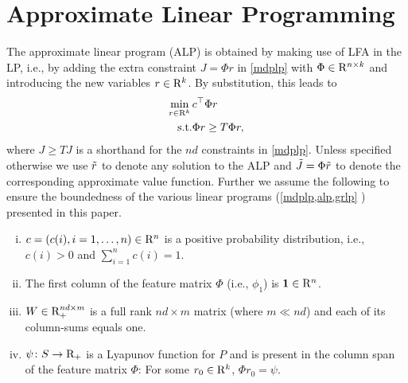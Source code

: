 \section{Approximate Linear Programming}
The approximate linear program (ALP) is obtained by making use of LFA in the LP, i.e., by adding the extra constraint $J=\Phi r$ in \eqref{mdplp} with $\Phi \in \mathrm{R}^{n\times k}$ and introducing the new variables $r\in \mathrm{R}^k$. By substitution, this leads to
\begin{align}\label{alp}
\begin{split}
\min_{r\in \R^k}\, &c^\top \Phi r\\
\text{s.t.}\mb &\Phi r\geq T \Phi r,
\end{split}
\end{align}
where $J\geq TJ$ is a shorthand for the $nd$ constraints in \eqref{mdplp}. Unless specified otherwise we use $\tilde{r}$ to denote any solution to the ALP and $\tilde{J}=\Phi \tilde{r}$ to denote the corresponding approximate value function. 
Further we assume the following to ensure the boundedness of the various linear programs (\cref{mdplp,alp,grlp} ) presented in this paper.
\begin{assumption}\label{mainassmp}
\begin{enumerate}[(i)]
\item \label{probdist} $c=(c(i),i=1,\ldots,n)\in \mathrm{R}^n$ is a positive probability distribution, i.e., $c(i)>0$ and $\sum_{i=1}^n c(i)=1$.
\item  \label{one} The first column of the feature matrix $\Phi$ (i.e., $\phi_1$) is $\mathbf{1} \in \mathrm{R}^n$. 
\item \label{wassump} $W \in \mathrm{R}^{nd\times m}_+$ is a full rank $nd\times m$  matrix (where $m\ll nd$) and each of its column-sums equals one.
\item \label{lyap} $\psi\colon S \rightarrow \mathrm{R}_+$ is a Lyapunov function for $P$
and is present in the column span of the feature matrix $\Phi$: For some $r_0\in \mathrm{R}^k$, $\Phi r_0 = \psi$. 
\end{enumerate}
\end{assumption}


